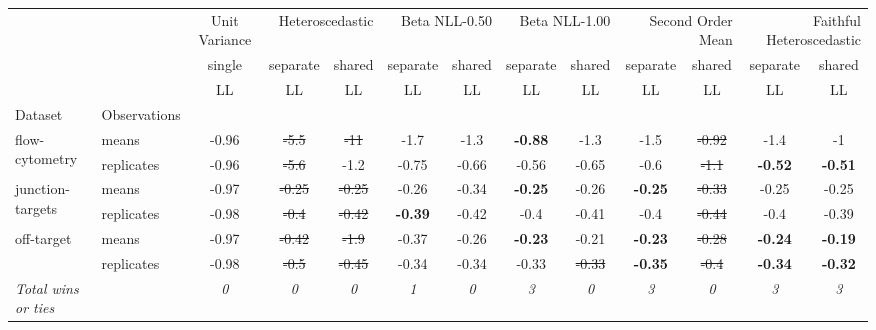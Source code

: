 \begin{tabular}{ll|c|cc|cc|cc|cc|cc}
\toprule
{} & {} & {Unit Variance} & \multicolumn{2}{r}{Heteroscedastic} & \multicolumn{2}{r}{Beta NLL-0.50} & \multicolumn{2}{r}{Beta NLL-1.00} & \multicolumn{2}{r}{Second Order Mean} & \multicolumn{2}{r}{Faithful Heteroscedastic} \\
{} & {} & {single} & {separate} & {shared} & {separate} & {shared} & {separate} & {shared} & {separate} & {shared} & {separate} & {shared} \\
{} & {} & {LL} & {LL} & {LL} & {LL} & {LL} & {LL} & {LL} & {LL} & {LL} & {LL} & {LL} \\
{Dataset} & {Observations} & {} & {} & {} & {} & {} & {} & {} & {} & {} & {} & {} \\
\midrule
\multirow[t]{2}{*}{flow-cytometry} & means & -0.96 & \sout{-5.5} & \sout{-11} & -1.7 & -1.3 & \textbf{-0.88} & -1.3 & -1.5 & \sout{-0.92} & -1.4 & -1 \\
 & replicates & -0.96 & \sout{-5.6} & -1.2 & -0.75 & -0.66 & -0.56 & -0.65 & -0.6 & \sout{-1.1} & \textbf{-0.52} & \textbf{-0.51} \\
\multirow[t]{2}{*}{junction-targets} & means & -0.97 & \sout{-0.25} & \sout{-0.25} & -0.26 & -0.34 & \textbf{-0.25} & -0.26 & \textbf{-0.25} & \sout{-0.33} & -0.25 & -0.25 \\
 & replicates & -0.98 & \sout{-0.4} & \sout{-0.42} & \textbf{-0.39} & -0.42 & -0.4 & -0.41 & -0.4 & \sout{-0.44} & -0.4 & -0.39 \\
\multirow[t]{2}{*}{off-target} & means & -0.97 & \sout{-0.42} & \sout{-1.9} & -0.37 & -0.26 & \textbf{-0.23} & -0.21 & \textbf{-0.23} & \sout{-0.28} & \textbf{-0.24} & \textbf{-0.19} \\
 & replicates & -0.98 & \sout{-0.5} & \sout{-0.45} & -0.34 & -0.34 & -0.33 & \sout{-0.33} & \textbf{-0.35} & \sout{-0.4} & \textbf{-0.34} & \textbf{-0.32} \\
\textit{{Total wins or ties}} &  & \textit{0} & \textit{0} & \textit{0} & \textit{1} & \textit{0} & \textit{3} & \textit{0} & \textit{3} & \textit{0} & \textit{3} & \textit{3} \\
\bottomrule
\end{tabular}
